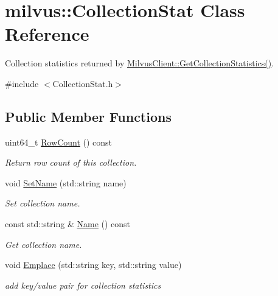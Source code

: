\hypertarget{classmilvus_1_1_collection_stat}{}\section{milvus\+:\+:Collection\+Stat Class Reference}
\label{classmilvus_1_1_collection_stat}


Collection statistics returned by \hyperlink{classmilvus_1_1_milvus_client_a0c49e2a5728a70f203118232c16ba47f}{Milvus\+Client\+::\+Get\+Collection\+Statistics()}.  




{\ttfamily \#include $<$Collection\+Stat.\+h$>$}

\subsection*{Public Member Functions}
\begin{DoxyCompactItemize}
\item 
\mbox{\label{classmilvus_1_1_collection_stat_abe35e504349f96d9f5351c00a3b82e55}} 
uint64\+\_\+t \hyperlink{classmilvus_1_1_collection_stat_abe35e504349f96d9f5351c00a3b82e55}{Row\+Count} () const
\begin{DoxyCompactList}\small\item\em Return row count of this collection. \end{DoxyCompactList}\item 
\mbox{\label{classmilvus_1_1_collection_stat_af5fe1a1cefdf4646b8f933ebabd49839}} 
void \hyperlink{classmilvus_1_1_collection_stat_af5fe1a1cefdf4646b8f933ebabd49839}{Set\+Name} (std\+::string name)
\begin{DoxyCompactList}\small\item\em Set collection name. \end{DoxyCompactList}\item 
\mbox{\label{classmilvus_1_1_collection_stat_a101e22ca65776ca349115b289fafd10d}} 
const std\+::string \& \hyperlink{classmilvus_1_1_collection_stat_a101e22ca65776ca349115b289fafd10d}{Name} () const
\begin{DoxyCompactList}\small\item\em Get collection name. \end{DoxyCompactList}\item 
\mbox{\label{classmilvus_1_1_collection_stat_a2d17f274d4de9160297187cb5b3aaa99}} 
void \hyperlink{classmilvus_1_1_collection_stat_a2d17f274d4de9160297187cb5b3aaa99}{Emplace} (std\+::string key, std\+::string value)
\begin{DoxyCompactList}\small\item\em add key/value pair for collection statistics \end{DoxyCompactList}\end{DoxyCompactItemize}



